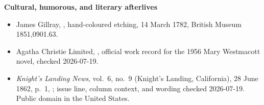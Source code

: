 \begin{deepstudy}
\textbf{Cultural, humorous, and literary afterlives}
{\footnotesize
\begin{itemize}[itemsep=0em,topsep=0.15em,parsep=0pt]
\item James Gillray, , hand-coloured etching, 14 March 1782, British Museum 1851,0901.63.
\item Agatha Christie Limited, , official work record for the 1956 Mary Westmacott novel, checked 2026-07-19.
\item \emph{Knight's Landing News}, vol.~6, no.~9 (Knight's Landing, California), 28 June 1862, p.~1, ; issue line, column context, and wording checked 2026-07-19. Public domain in the United States.
\end{itemize}}


\end{deepstudy}
